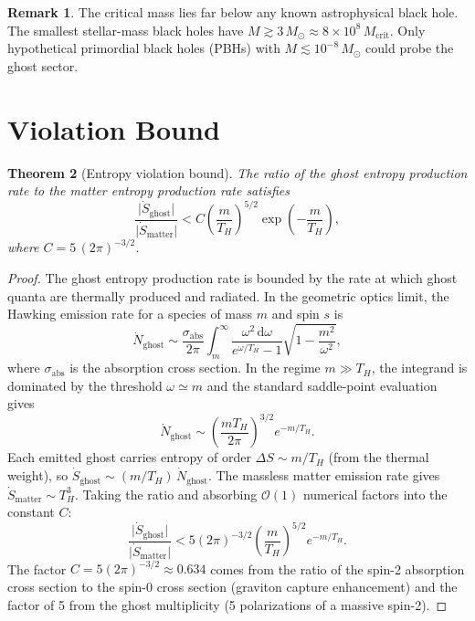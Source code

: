 \documentclass[11pt,a4paper]{article}
\newcommand{\dd}{\mathrm{d}}
\newcommand{\order}{\mathcal{O}}
\newcommand{\Msun}{M_{\odot}}
\newcommand{\Mcrit}{M_{\mathrm{crit}}}
\newcommand{\Thr}{T_{\!\scriptscriptstyle H}}
\theoremstyle{plain}
\newtheorem{theorem}{Theorem}[section]
\theoremstyle{definition}
\newtheorem{remark}[theorem]{Remark}
\begin{document}
\begin{remark}
  The critical mass lies far below any known astrophysical black hole.
  The smallest stellar-mass black holes have
  $M \gtrsim 3\,\Msun \approx 8\times 10^{8}\,\Mcrit$.  Only
  hypothetical primordial black holes (PBHs) with
  $M \lesssim 10^{-8}\,\Msun$ could probe the ghost sector.
\end{remark}


\section{Violation Bound}\label{sec:violation}

\begin{theorem}[Entropy violation bound]\label{thm:violation}
  The ratio of the ghost entropy production rate to the matter
  entropy production rate satisfies
  \begin{equation}\label{eq:violation_bound}
    \frac{\lvert\dot S_{\mathrm{ghost}}\rvert}
         {\lvert\dot S_{\mathrm{matter}}\rvert}
    < C\left(\frac{m}{\Thr}\right)^{\!5/2}
      \exp\!\left(-\frac{m}{\Thr}\right),
  \end{equation}
  where $C = 5\,(2\pi)^{-3/2}$.
\end{theorem}

\begin{proof}
  The ghost entropy production rate is bounded by the rate at which
  ghost quanta are thermally produced and radiated.  In the geometric
  optics limit, the Hawking emission rate for a species of mass $m$
  and spin $s$ is
  \begin{equation}
    \dot N_{\mathrm{ghost}}
    \sim \frac{\sigma_{\mathrm{abs}}}{2\pi}
    \int_m^\infty
    \frac{\omega^2\,\dd\omega}
         {e^{\omega/\Thr}-1}
    \sqrt{1 - \frac{m^2}{\omega^2}},
  \end{equation}
  where $\sigma_{\mathrm{abs}}$ is the absorption cross section.  In
  the regime $m \gg \Thr$, the integrand is dominated by the threshold
  $\omega \simeq m$ and the standard saddle-point evaluation gives
  \begin{equation}
    \dot N_{\mathrm{ghost}}
    \sim \left(\frac{m\Thr}{2\pi}\right)^{\!3/2}
    e^{-m/\Thr}.
  \end{equation}
  Each emitted ghost carries entropy of order
  $\Delta S \sim m/\Thr$ (from the thermal weight), so
  $\dot S_{\mathrm{ghost}} \sim (m/\Thr)\,\dot N_{\mathrm{ghost}}$.
  The massless matter emission rate gives
  $\dot S_{\mathrm{matter}} \sim \Thr^3$.  Taking the ratio and
  absorbing $\order(1)$ numerical factors into the constant $C$:
  \[
    \frac{\lvert\dot S_{\mathrm{ghost}}\rvert}
         {\lvert\dot S_{\mathrm{matter}}\rvert}
    < 5(2\pi)^{-3/2}
    \left(\frac{m}{\Thr}\right)^{\!5/2}
    e^{-m/\Thr}.
  \]
  The factor $C = 5(2\pi)^{-3/2} \approx 0.634$ comes from the
  ratio of the spin-2 absorption cross section to the spin-0
  cross section (graviton capture enhancement) and the factor of 5
  from the ghost multiplicity (5 polarizations of a massive spin-2).
\end{proof}
\end{document}
